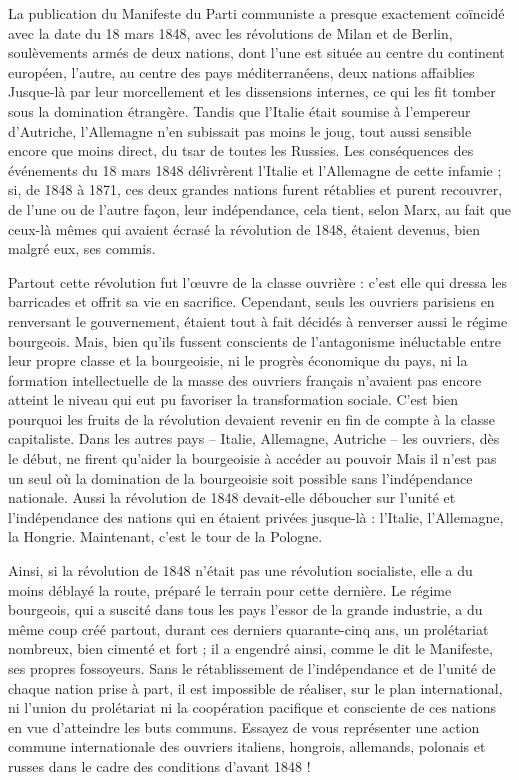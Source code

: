 \documentclass[french,twoside]{book} %
\newcommand{\salute}[1]{\bigbreak{#1}\par\medbreak}
\begin{document}
\salute{Au lecteur italien,}
\noindent La publication du Manifeste du Parti communiste a presque exactement coïncidé avec la date du 18 mars 1848, avec les révolutions de Milan et de Berlin, soulèvements armés de deux nations, dont l’une est située au centre du continent européen, l’autre, au centre des pays méditerranéens, deux nations affaiblies Jusque-là par leur morcellement et les dissensions internes, ce qui les fit tomber sous la domination étrangère. Tandis que l’Italie était soumise à l’empereur d’Autriche, l’Allemagne n’en subissait pas moins le joug, tout aussi sensible encore que moins direct, du tsar de toutes les Russies. Les conséquences des événements du 18 mars 1848 délivrèrent l’Italie et l’Allemagne de cette infamie ; si, de 1848 à 1871, ces deux grandes nations furent rétablies et purent recouvrer, de l’une ou de l’autre façon, leur indépendance, cela tient, selon Marx, au fait que ceux-là mêmes qui avaient écrasé la révolution de 1848, étaient devenus, bien malgré eux, ses commis.\par
Partout cette révolution fut l’œuvre de la classe ouvrière : c’est elle qui dressa les barricades et offrit sa vie en sacrifice. Cependant, seuls les ouvriers parisiens en renversant le gouvernement, étaient tout à fait décidés à renverser aussi le régime bourgeois. Mais, bien qu’ils fussent conscients de l’antagonisme inéluctable entre leur propre classe et la bourgeoisie, ni le progrès économique du pays, ni la formation intellectuelle de la masse des ouvriers français n’avaient pas encore atteint le niveau qui eut pu favoriser la transformation sociale. C'est bien pourquoi les fruits de la révolution devaient revenir en fin de compte à la classe capitaliste. Dans les autres pays – Italie, Allemagne, Autriche – les ouvriers, dès le début, ne firent qu’aider la bourgeoisie à accéder au pouvoir Mais il n’est pas un seul où la domination de la bourgeoisie soit possible sans l’indépendance nationale. Aussi la révolution de 1848 devait-elle déboucher sur l’unité et l’indépendance des nations qui en étaient privées jusque-là : l’Italie, l’Allemagne, la Hongrie. Maintenant, c’est le tour de la Pologne.\par
Ainsi, si la révolution de 1848 n’était pas une révolution socialiste, elle a du moins déblayé la route, préparé le terrain pour cette dernière. Le régime bourgeois, qui a suscité dans tous les pays l’essor de la grande industrie, a du même coup créé partout, durant ces derniers quarante-cinq ans, un prolétariat nombreux, bien cimenté et fort ; il a engendré ainsi, comme le dit le Manifeste, ses propres fossoyeurs. Sans le rétablissement de l’indépendance et de l’unité de chaque nation prise à part, il est impossible de réaliser, sur le plan international, ni l’union du prolétariat ni la coopération pacifique et consciente de ces nations en vue d’atteindre les buts communs. Essayez de vous représenter une action commune internationale des ouvriers italiens, hongrois, allemands, polonais et russes dans le cadre des conditions d’avant 1848 !\par
\end{document}
